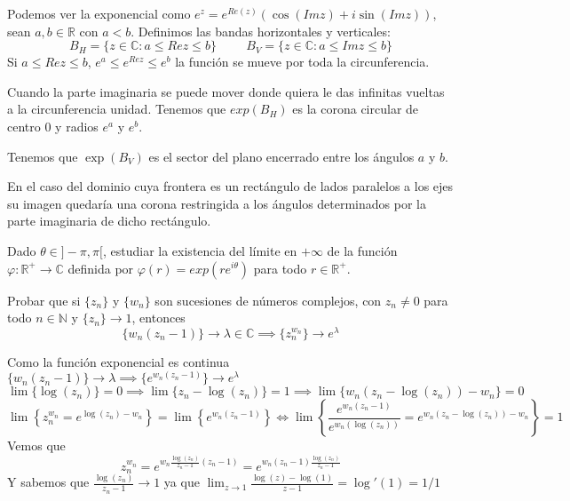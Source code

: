 \begin{sol}

Podemos ver la exponencial como $e^z = e^{Re(z)} (\cos(Imz) + i\sin(Imz))$, sean $a,b\in\mathbb{R}$ con $a<b$.
Definimos las bandas horizontales y verticales:
$$B_H = \{ z\in\mathbb{C} : a\leq Rez \leq b \} \hspace{1cm} B_V = \{ z\in\mathbb{C} : a\leq Imz \leq b \}$$
Si $a\leq Rez \leq b$, $e^a \leq e^{Rez} \leq e^b$
la función se mueve por toda la circunferencia.%

Cuando la parte imaginaria se puede mover donde quiera le das infinitas vueltas a la circunferencia unidad. Tenemos que
$exp(B_H)$ es la corona circular de centro $0$ y radios $e^a$ y $e^b$.

Tenemos que $\exp(B_V)$ es el sector del plano encerrado entre los ángulos $a$ y $b$.

En el caso del dominio cuya frontera es un rectángulo de lados paralelos a los ejes su imagen quedaría una corona restringida a los ángulos determinados por la parte imaginaria de dicho rectángulo.


\end{sol}


\begin{ejer}
	Dado $\theta\in]-\pi,\pi[$, estudiar la existencia del límite en $+\infty$ de la función $\varphi : \mathbb{R}^+\rightarrow\mathbb{C}$ definida por $\varphi(r) = exp(re^{i\theta})$ para todo $r\in\mathbb{R}^+$.
\end{ejer}



\begin{ejer}
Probar que si $\{z_n\}$ y $\{w_n\}$ son sucesiones de números complejos, con $z_n \not = 0$ para todo
$n\in \mathbb{N}$ y $\{ z_n \} \rightarrow 1$, entonces
$$ \{w_n(z_n-1)\} \rightarrow \lambda\in\mathbb{C} \implies \{ z_n^{w_n} \}\rightarrow e^{\lambda} $$
\end{ejer}

\begin{sol}

Como la función exponencial es continua
$\{ w_n (z_n-1) \} \rightarrow \lambda \implies \{ e^{w_n(z_n-1)} \} \rightarrow e^{\lambda}$
$$\lim \{ \log(z_n) \} = 0 \implies \lim \{ z_n-\log(z_n) \} = 1 \implies \lim \{ w_n(z_n-\log(z_n))-w_n \} = 0$$
$$\lim \left\{ z_n^{w_n} = e^{\log(z_n)-w_n} \right\}= \lim \left\{ e^{w_n (z_n-1)} \right\} \Longleftrightarrow \lim\left\{ \frac{e^{w_n(z_n-1)}}{e^{w_n (\log(z_n))}} = e^{w_n (z_n-\log(z_n))-w_n} \right\} = 1$$
Vemos que
$$z_n^{w_n} = e^{w_n \frac{\log(z_n)}{z_n-1} (z_n-1)} =  e^{w_n (z_n-1) \frac{\log(z_n)}{z_n-1}}$$
Y sabemos que $ \frac{\log(z_n)}{z_n-1} \rightarrow 1$ ya que
$\lim_{z\rightarrow 1} \frac{\log(z)-\log(1)}{z-1} = \log'(1) = 1/1$

\end{sol}





